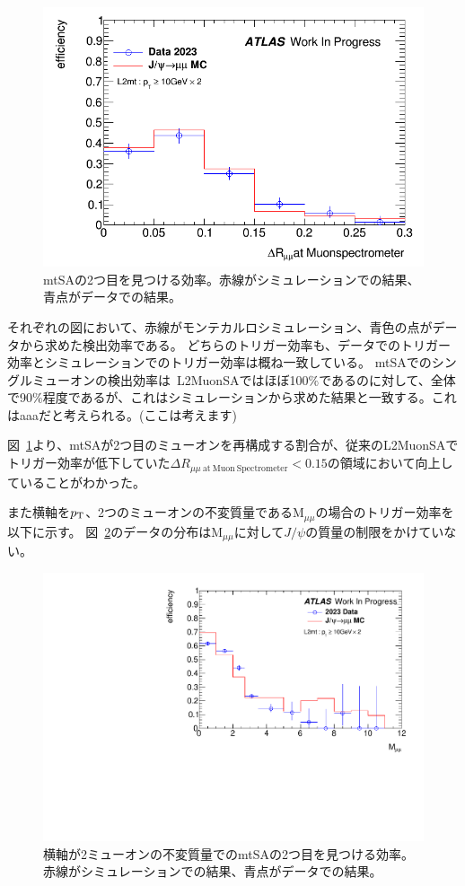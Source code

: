 \begin{figure}[H]
    \centering
    \includegraphics[clip, width=12cm]{fig/4/L2mt_eff_ext_deltaR.png}
    \caption{mtSAの2つ目を見つける効率。赤線がシミュレーションでの結果、青点がデータでの結果。}
    \label{fig:L2mt2muonEff}
\end{figure}

それぞれの図において、赤線がモンテカルロシミュレーション、青色の点がデータから求めた検出効率である。
どちらのトリガー効率も、データでのトリガー効率とシミュレーションでのトリガー効率は概ね一致している。
mtSAでのシングルミューオンの検出効率は~L2MuonSAではほぼ100$\%$であるのに対して、全体で90$\%$程度であるが、これはシミュレーションから求めた結果と一致する。これはaaaだと考えられる。(ここは考えます)

図~\ref{fig:L2mt2muonEff}より、mtSAが2つ目のミューオンを再構成する割合が、従来のL2MuonSAでトリガー効率が低下していた$\Delta R_{\mu\mu~\mathrm{at~Muon~Spectrometer}}<0.15$の領域において向上していることがわかった。

また横軸を$p_\mathrm{T}$、2つのミューオンの不変質量である$\mathrm{M}_{\mu\mu}$の場合のトリガー効率を以下に示す。
図~\ref{fig:L2mtMassEff}のデータの分布は$\mathrm{M}_{\mu\mu}$に対して$J/\psi$の質量の制限をかけていない。

\begin{figure}[h]
    \centering
    \includegraphics[clip, width=12cm]{fig/4/L2mt_eff_mass.pdf}
    \caption{横軸が2ミューオンの不変質量でのmtSAの2つ目を見つける効率。赤線がシミュレーションでの結果、青点がデータでの結果。}
    \label{fig:L2mtMassEff}
\end{figure}


